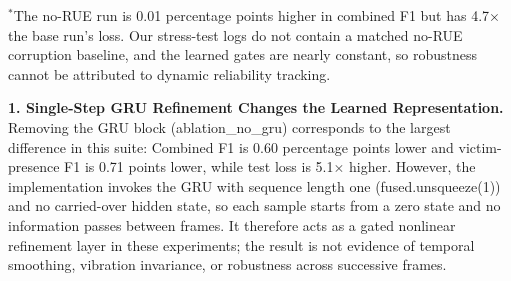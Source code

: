 \begin{table}[H]
\centering
\caption[Component ablations of AdapFuse-v1]{Component ablations of AdapFuse-v1 ($n=10{,}951$). Single runs; no repeated seeds or confidence intervals.}
\label{tab:ablation_results}
\footnotesize{$^*$The no-RUE run is 0.01 percentage points higher in combined F1 but has 4.7$\times$ the base run's loss. Our stress-test logs do not contain a matched no-RUE corruption baseline, and the learned gates are nearly constant, so robustness cannot be attributed to dynamic reliability tracking.}
\end{table}

\textbf{1. Single-Step GRU Refinement Changes the Learned Representation.}
Removing the GRU block (ablation\_no\_gru) corresponds to the largest difference in this suite: Combined F1 is 0.60 percentage points lower and victim-presence F1 is 0.71 points lower, while test loss is 5.1$\times$ higher. However, the implementation invokes the GRU with sequence length one (fused.unsqueeze(1)) and no carried-over hidden state, so each sample starts from a zero state and no information passes between frames. It therefore acts as a gated nonlinear refinement layer in these experiments; the result is not evidence of temporal smoothing, vibration invariance, or robustness across successive frames.

